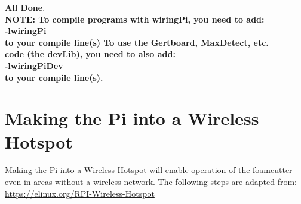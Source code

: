 \documentclass[titlepage,12pt,letter]{report}
\numberwithin{equation}{chapter}
\begin{document}
\begin{enumerate}[itemsep = 5pt,topsep=0pt]
\textbf{All Done}. \\
	
	\textbf{NOTE: To compile programs with wiringPi, you need to add: \\
	-lwiringPi \\
	to your compile line(s) To use the Gertboard, MaxDetect, etc.\\
	code (the devLib), you need to also add:\\
	-lwiringPiDev\\
	to your compile line(s).\\}
	
\end{enumerate}

\section{Making the Pi into a Wireless Hotspot}
Making the Pi into a Wireless Hotspot will enable operation of the foamcutter even in areas without a wireless network. The following steps are adapted from: \href{https://elinux.org/RPI-Wireless-Hotspot}{https://elinux.org/RPI-Wireless-Hotspot}
\end{document}
